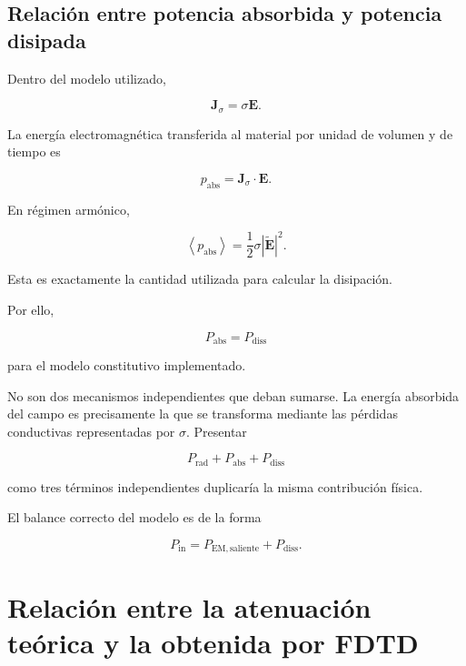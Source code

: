 \subsection{Relación entre potencia absorbida y potencia disipada}

Dentro del modelo utilizado,

\begin{equation}
\mathbf{J}_{\sigma}
=
\sigma\mathbf{E}.
\end{equation}

La energía electromagnética transferida al material por unidad de volumen y de tiempo es

\begin{equation}
p_{\mathrm{abs}}
=
\mathbf{J}_{\sigma}\cdot\mathbf{E}.
\end{equation}

En régimen armónico,

\begin{equation}
\left\langle
p_{\mathrm{abs}}
\right\rangle
=
\frac{1}{2}
\sigma|\widetilde{\mathbf{E}}|^2.
\end{equation}

Esta es exactamente la cantidad utilizada para calcular la disipación.

Por ello,

\begin{equation}
\boxed{
P_{\mathrm{abs}}
=
P_{\mathrm{diss}}
}
\end{equation}

para el modelo constitutivo implementado.

No son dos mecanismos independientes que deban sumarse. La energía absorbida del campo es precisamente la que se transforma mediante las pérdidas conductivas representadas por $\sigma$. Presentar

\begin{equation}
P_{\mathrm{rad}}
+
P_{\mathrm{abs}}
+
P_{\mathrm{diss}}
\end{equation}

como tres términos independientes duplicaría la misma contribución física.

El balance correcto del modelo es de la forma

\begin{equation}
P_{\mathrm{in}}
=
P_{\mathrm{EM,saliente}}
+
P_{\mathrm{diss}}.
\end{equation}

\section{Relación entre la atenuación teórica y la obtenida por FDTD}

